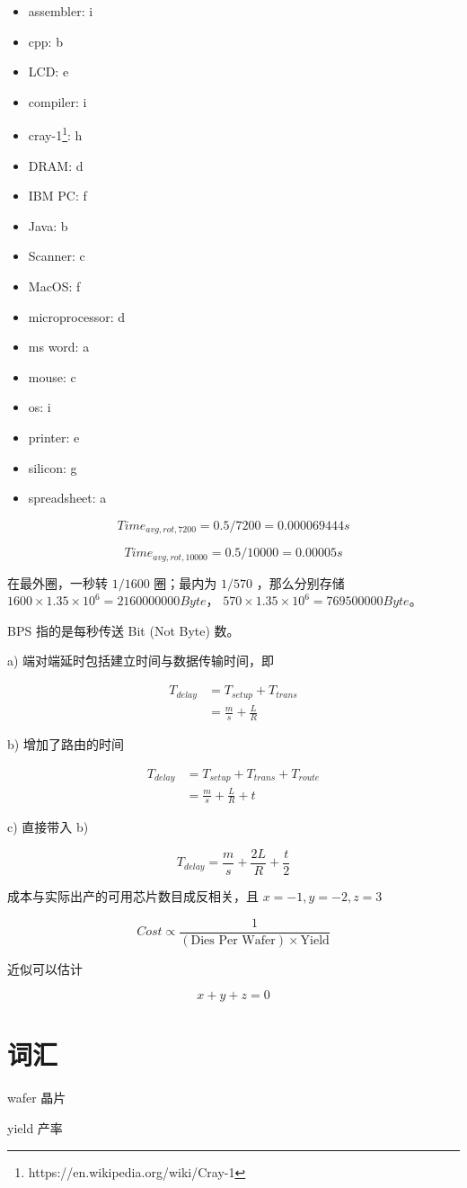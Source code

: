 \documentclass[lang=cn,11pt,a4paper,cite=authoryear]{elegantpaper}
\begin{document}
\begin{itemize}
    \item assembler: i 
    \item cpp: b
    \item LCD: e 
    \item compiler: i 
    \item cray-1\footnote{https://en.wikipedia.org/wiki/Cray-1}: h
    \item DRAM: d
    \item IBM PC: f
    \item Java: b
    \item Scanner: c 
    \item MacOS: f 
    \item microprocessor: d
    \item ms word: a 
    \item mouse: c
    \item os: i 
    \item printer: e 
    \item silicon: g 
    \item spreadsheet: a
\end{itemize}


\[Time_{avg,rot,7200} = 0.5 / 7200 = 0.000069444 s\]

\[Time_{avg,rot,10000} = 0.5 / 10000 = 0.00005 s\]


在最外圈，一秒转 \(1/1600\) 圈；最内为 \(1/570\) ，那么分别存储 \(1600 \times 1.35 \times 10^6 = 2160000000 Byte\)， \(570 \times 1.35 \times 10^6 = 769500000 Byte\)。


BPS 指的是每秒传送 Bit (Not Byte) 数。

a) 端对端延时包括建立时间与数据传输时间，即

\[
\begin{aligned}
    T_{delay} &= T_{setup} + T_{trans} \\
    &= \frac{m}{s} + \frac{L}{R}
\end{aligned}
\]


b) 增加了路由的时间

\[
\begin{aligned}
    T_{delay} &= T_{setup} + T_{trans} + T_{route}\\
    &= \frac{m}{s} + \frac{L}{R} + t
\end{aligned}
\]


c) 直接带入 b)

\[T_{delay} = \frac{m}{s} + \frac{2L}{R} + \frac{t}{2}\]




成本与实际出产的可用芯片数目成反相关，且 \(x=-1,y=-2,z=3\)

\[Cost \propto \frac{1}{(\text{Dies Per Wafer}) \times \text{Yield}}\]

近似可以估计

\[x + y + z = 0\]

\section*{词汇}

wafer 晶片

yield 产率

\end{document}
